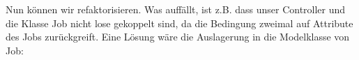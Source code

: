 Nun können wir refaktorisieren. Was auffällt, ist z.B. dass unser Controller und die Klasse Job nicht lose gekoppelt sind, da die Bedingung zweimal auf Attribute des Jobs zurückgreift. Eine Lösung wäre die Auslagerung in die Modelklasse von Job:
\tddrefactor
%                                                                                                                                                                    
%                                                                                                                                                                    
